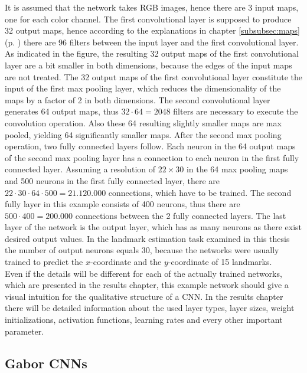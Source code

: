 \documentclass[11pt, a4paper]{article}
\newcommand\myref[1]{\ref{#1} (p. \pageref{#1})}
\begin{document}
It is assumed that the network takes \ac{RGB} images, hence there are 3 input maps, one for each color channel. The first convolutional layer is supposed to produce 32 output maps, hence according to the explanations in chapter \myref{subsubsec:maps} there are 96 filters between the input layer and the first convolutional layer. As indicated in the figure, the resulting 32 output maps of the first convolutional layer are a bit smaller in both dimensions, because the edges of the input maps are not treated. The 32 output maps of the first convolutional layer constitute the input of the first max pooling layer, which reduces the dimensionality of the maps by a factor of 2 in both dimensions. The second convolutional layer generates 64 output maps, thus $32 \cdot 64 = 2048$ filters are necessary to execute the convolution operation. Also these 64 resulting slightly smaller maps are max pooled, yielding 64 significantly smaller maps. After the second max pooling operation, two fully connected layers follow. Each neuron in the 64 output maps of the second max pooling layer has a connection to each neuron in the first fully connected layer. Assuming a resolution of $22\times 30$ in the 64 max pooling maps and 500 neurons in the first fully connected layer, there are $22 \cdot 30 \cdot 64 \cdot 500 = 21.120.000$ connections, which have to be trained. The second fully layer in this example consists of 400 neurons, thus there are $500 \cdot 400 = 200.000$ connections between the 2 fully connected layers. The last layer of the network is the output layer, which has as many neurons as there exist desired output values. In the landmark estimation task examined in this thesis the number of output neurons equals 30, because the networks were usually trained to predict the $x$-coordinate and the $y$-coordinate of 15 landmarks.\\
Even if the details will be different for each of the actually trained networks, which are presented in the results chapter, this example network should give a visual intuition for the qualitative structure of a \ac{CNN}. In the results chapter there will be detailed information about the used layer types, layer sizes, weight initializations, activation functions, learning rates and every other important parameter.

\subsection{Gabor CNNs}
\label{subsec:gaborcnns}
\end{document}
